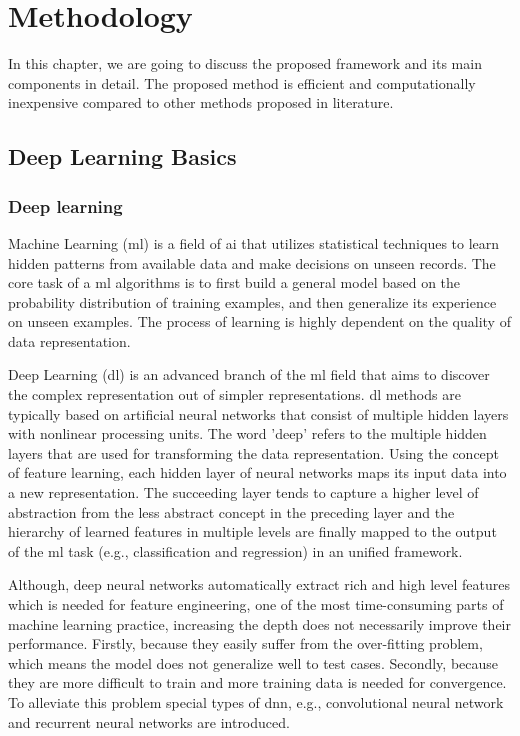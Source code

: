 \chapter{Methodology}\label{ch:methodology}
In this chapter, we are going to discuss the proposed framework and its main components in detail. The proposed method is efficient and computationally inexpensive compared to other methods proposed in literature. 


\section{Deep Learning Basics}
\subsection{Deep learning}
Machine Learning (\gls{ml}) is a field of \gls{ai} that utilizes statistical techniques to learn hidden patterns from available data and make decisions on unseen records. The core task of a \gls{ml} algorithms is to first build a general model based on the probability distribution of training examples, and then generalize its experience on unseen examples. The process of learning is highly dependent on the quality of data representation.

Deep Learning (\gls{dl}) is an advanced branch of the \gls{ml} field that aims to discover the complex representation out of simpler representations. \gls{dl} methods are typically based on artificial neural networks that consist of multiple hidden layers with nonlinear processing units. The word 'deep' refers to the multiple hidden layers that are used for transforming the data representation. Using the concept of feature learning, each hidden layer of neural networks maps its input data into a new representation. The succeeding layer tends to capture a higher level of abstraction from the less abstract concept in the preceding layer and the hierarchy of learned features in multiple levels are finally mapped to the output of the \gls{ml} task (e.g., classification and regression) in an unified framework.

Although, deep neural networks automatically extract rich and high level features which is needed for feature engineering, one of the most time-consuming parts of machine learning practice, increasing the depth does not necessarily improve their performance. Firstly, because they easily suffer from the over-fitting problem, which means the model does not generalize well to test cases. Secondly, because they are more difficult to train and more training data is needed for convergence. To alleviate this problem special types of \gls{dnn}, e.g., convolutional neural network and recurrent neural networks are introduced.

